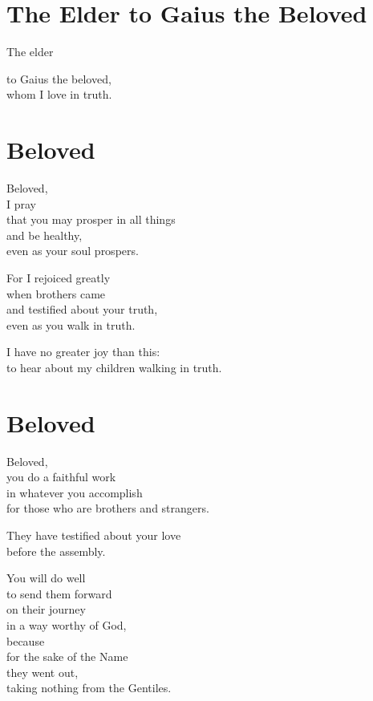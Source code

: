 \documentclass[twoside, openany, 12pt]{extbook}
\newcommand{\tab}[1][0.5cm]{\hspace*{#1}}
\begin{document}
\newpage\section{The Elder to Gaius the Beloved}

The elder

to Gaius the beloved,
\\
\tab{}
whom I love in truth.

\newpage\section{Beloved}

Beloved,
\\
I pray
\\
\tab{}
that you may prosper in all things
\\
\tab{}
and be healthy,
\\
\tab{}
\tab{}
even as your soul prospers.

For I rejoiced greatly
\\
\tab{}
when brothers came
\\
\tab{}
and testified about your truth,
\\
\tab{}
\tab{}
even as you walk in truth.

I have no greater joy than this:
\\
\tab{}
to hear about my children walking in truth.

\newpage\section{Beloved}

Beloved,
\\
you do a faithful work
\\
\tab{}
in whatever you accomplish
\\
\tab{}
\tab{}
for those who are brothers and strangers.

They have testified about your love
\\
\tab{}
before the assembly.

You will do well
\\
\tab{}
to send them forward
\\
\tab{}
\tab{}
on their journey
\\
\tab{}
\tab{}
\tab{}
in a way worthy of God,
\\
because
\\
\tab{}
for the sake of the Name
\\
\tab{}
\tab{}
they went out,
\\
\tab{}
\tab{}
\tab{}
taking nothing from the Gentiles.
\end{document}
